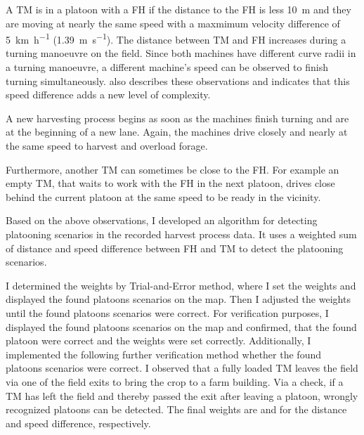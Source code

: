 A \ac{TM} is in a platoon with a \ac{FH} if the distance to the \ac{FH} is less \SI{10}{\metre} and they are moving at nearly the same speed with a maxmimum
velocity difference of \SI{5}{\km\per\hour} (\SI{1.39}{\metre\per\second}).
The distance between \ac{TM} and \ac{FH} increases during a turning manoeuvre on the field. Since both machines have different curve radii in a turning manoeuvre, a different machine's speed can be observed to finish turning simultaneously.
\textcite{smolnik_5g_2020} also describes these observations and indicates that this speed difference adds a new level of complexity.

A new harvesting process begins as soon as the machines finish turning and are at the beginning of a new lane.
Again, the machines drive closely and nearly at the same speed to harvest and overload forage.

Furthermore, another \ac{TM} can sometimes be close to the \ac{FH}. For example an empty TM, that waits to work with the \ac{FH} in the next platoon, drives close behind the current platoon at the same speed to be ready in the vicinity.

Based on the above observations, I developed an algorithm for detecting platooning scenarios in the recorded harvest process data. It uses a weighted sum of distance and speed difference between \ac{FH} and \ac{TM} to detect the platooning scenarios.

I determined the weights by Trial-and-Error method, where I set the weights and displayed the found platoons scenarios on the map.
Then I adjusted the weights until the found platoons scenarios were correct. For verification purposes, I displayed the found platoons scenarios on the map
and confirmed, that the found platoon were correct and the weights were set correctly.
Additionally, I implemented the following further verification method whether the found platoons scenarios were correct.
I observed that a fully loaded \ac{TM} leaves the field via one of the field exits to bring the crop to a farm building.
Via a check, if a \ac{TM} has left the field and thereby passed the exit after leaving a platoon, wrongly recognized platoons can be detected.
The final weights are  and  for the distance and speed difference, respectively.


